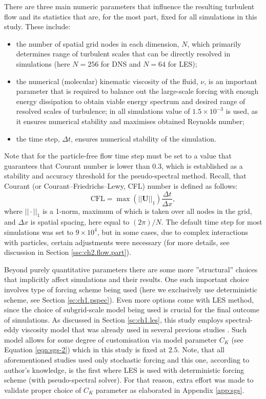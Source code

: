 \documentclass{pracamgren}
\begin{document}
There are three main numeric parameters that influence the resulting turbulent flow and its statistics that are, for the most part, fixed for all simulations in this study.
These include:
\begin{itemize}
\item the number of spatial grid nodes in each dimension, $N$, which primarily determines range of turbulent scales that can be directly resolved in simulations (here $N=256$ for DNS and $N=64$ for LES);
\item the numerical (molecular) kinematic viscosity of the fluid, $\nu$, is an important parameter that is required to balance out the large-scale forcing with enough energy dissipation to obtain viable energy spectrum and desired range of resolved scales of turbulence; in all simulations value of $1.5 \times 10^{-3}$ is used, as it ensures numerical stability and maximises obtained Reynolds number;
\item the time step, $\Delta t$, ensures numerical stability of the simulation.
\end{itemize}
Note that for the particle-free flow time step must be set to a value that guarantees that Courant number is lower than $0.3$, which is established as a stability and accuracy threshold for the pseudo-spectral method.
Recall, that Courant (or Courant--Friedrichs--Lewy, CFL) number is defined as follows:
$$ \text{CFL} = \max ( || \mathbf{U} ||_1 ) \frac{\Delta t}{\Delta x} , $$
where $|| \cdot ||_1$ is a 1-norm, maximum of which is taken over all nodes in the grid, and $\Delta x$ is spatial spacing, here equal to $(2 \pi) / N$. 
The default time step for most simulations was set to $9 \times 10^{4}$, but in some cases, due to complex interactions with particles, certain adjustments were necessary (for more details, see discussion in Section \ref{ssc:ch2.flow.part}).

Beyond purely quantitative parameters there are some more ''structural'' choices that implicitly affect simulations and their results.
One such important choice involves type of forcing scheme being used (here we exclusively use deterministic scheme, see Section \ref{sc:ch1.pspec}).
Even more options come with LES method, since the choice of subgrid-scale model being used is crucial for the final outcome of simulations.
As discussed in Section \ref{sc:ch1.les}, this study employs spectral-eddy viscosity model that was already used in several previous studies \parencite{Yang2008, Jin2010, Rosa2017}.
Such model allows for some degree of customisation via model parameter $C_K$ (see Equation \ref{eqn:sgs-2}) which in this study is fixed at $2.5$.
Note, that all aforementioned studies used only stochastic forcing and this one, according to author's knowledge, is the first where LES is used with deterministic forcing scheme (with pseudo-spectral solver).
For that reason, extra effort was made to validate proper choice of $C_K$ parameter as elaborated in Appendix \ref{app:sgs}. 
\end{document}
